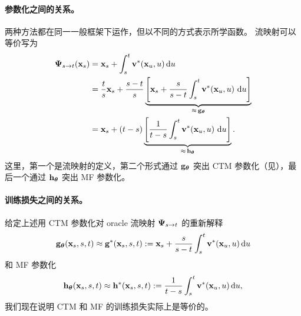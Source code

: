 \paragraph{参数化之间的关系。}
两种方法都在同一一般框架下运作，但以不同的方式表示所学函数。
流映射可以等价写为
\begin{align*}
{\bm{\Psi}}_{s\to t}({\mathbf{x}}_s)
& = {\mathbf{x}}_s + \int_s^t {\mathbf{v}}^*({\mathbf{x}}_u, u)\mathop{}\!\mathrm{d} u \\
&= \frac{t}{s}{\mathbf{x}}_s
   + \frac{s-t}{s}\underbrace{\Bigg[{\mathbf{x}}_s + \frac{s}{s-t}\int_s^t {\mathbf{v}}^*({\mathbf{x}}_u,u)\,\mathop{}\!\mathrm{d} u\Bigg]}_{\approx\,{\mathbf{g}}_{\bm{\theta}}} \\
&= {\mathbf{x}}_s + (t-s)\underbrace{\Bigg[\frac{1}{t-s}\int_s^t {\mathbf{v}}^*({\mathbf{x}}_u,u)\,\mathop{}\!\mathrm{d} u\Bigg]}_{\approx\,{\mathbf{h}}_{\bm{\theta}}}.
\end{align*}
这里，第一个是流映射的定义，第二个形式通过 ${\mathbf{g}}_{\bm{\theta}}$ 突出 CTM 参数化（见），最后一个通过 ${\mathbf{h}}_{\bm{\theta}}$ 突出 MF 参数化。


\paragraph{训练损失之间的关系。} 给定上述用 CTM 参数化对 oracle 流映射 ${\bm{\Psi}}_{s\to t}$ 的重新解释
\[
{\mathbf{g}}_{\bm{\theta}}({\mathbf{x}}_s,s,t) \approx {\mathbf{g}}^*({\mathbf{x}}_s,s,t):={\mathbf{x}}_s + \frac{s}{s-t}\int_s^t {\mathbf{v}}^*({\mathbf{x}}_u,u) \mathop{}\!\mathrm{d} u
\]
 和 MF 参数化
\[
{\mathbf{h}}_{\bm{\theta}}({\mathbf{x}}_s,s,t) \approx {\mathbf{h}}^*({\mathbf{x}}_s,s,t):=\frac{1}{t-s}\int_s^t {\mathbf{v}}^*({\mathbf{x}}_u,u) \mathop{}\!\mathrm{d} u,
\]
我们现在说明 CTM 和 MF 的训练损失实际上是等价的。


